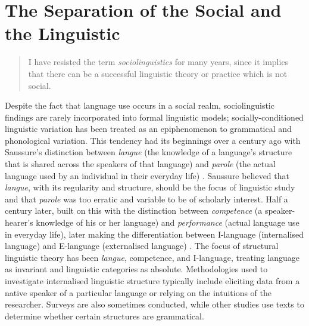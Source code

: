\chapter{The Separation of the Social and the Linguistic}
\label{ch:intro}
\date{}

\begin{quote}
	I have resisted the term \textit{sociolinguistics} for many years, since it implies that there can be a successful linguistic theory or practice which is not social. \cite[xix]{labov1972sociolingpatterns}
\end{quote}

\noindent Despite the fact that language use occurs in a social realm, sociolinguistic findings are rarely incorporated into formal linguistic models; socially-conditioned linguistic variation has been treated as an epiphenomenon to grammatical and phonological variation.  This tendency had its beginnings over a century ago with Saussure's distinction between \textit{langue} (the knowledge of a language's structure that is shared across the speakers of that language) and \textit{parole} (the actual language used by an individual in their everyday life) \cite{saussure1916}.  Saussure believed that \textit{langue}, with its regularity and structure, should be the focus of linguistic study and that \textit{parole} was too erratic and variable to be of scholarly interest.  Half a century later,  built on this with the distinction between  \textit{competence} (a speaker-hearer's knowledge of his or her language) and \textit{performance} (actual language use in everyday life), later making the differentiation between I-language (internalised language) and E-language (externalised language) \cite[20-22]{chomsky1986}.  The focus of structural linguistic theory has been \textit{langue}, competence, and I-language, treating language as invariant and linguistic categories as absolute.  Methodologies used to investigate internalised linguistic structure typically include eliciting data from a native speaker of a particular language or relying on the intuitions of the researcher.  Surveys are also sometimes conducted, while other studies use texts to determine whether certain structures are grammatical.  

